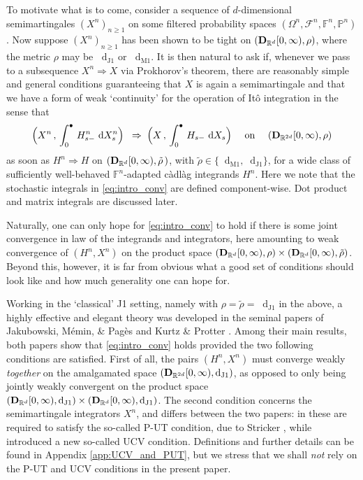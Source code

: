 \documentclass[11pt]{article}
\theoremstyle{definition}\newtheorem{example}[theorem]{Example}
\theoremstyle{definition}\newtheorem{counterexample}[theorem]{Counterexample}
\theoremstyle{definition}\newtheorem{remark}[theorem]{Remark}
\theoremstyle{definition}\newtheorem{defi}[theorem]{Definition}
\numberwithin{equation}{section}
\newcommand{\R}{\mathbb{R}}
\newcommand{\D}{{\bf D}}											%
\newcommand{\F}{\mathbb{F}}											%
\newcommand*\diff{\mathop{}\!\mathrm{d}}								%
\newcommand{\Pro}{\mathbb{P}}										%
\renewcommand{\|}{\; : \, \;}											%
\newcommand{\dJ}{\diff_{\operatorname{J1}}}								%
\newcommand{\dM}{\diff_{\operatorname{M1}}}							%
\begin{document}
To motivate what is to come, consider a sequence of $d$-dimensional semimartingales $(X^n)_{n\geq 1}$ on some filtered probability spaces $(\Omega^n, \mathcal{F}^n, \F^n, \Pro^n)$. Now suppose $(X^n)_{n\geq 1}$ has been shown to be tight on $(\D_{\R^d}[0,\infty),\rho )$, where the metric $\rho$ may be $\dJ$ or $\dM$. It is then natural to ask if, whenever we pass to a subsequence $X^n \Rightarrow X$ via Prokhorov's theorem, there are reasonably simple and general conditions guaranteeing that $X$ is again a semimartingale and that we have a form of weak `continuity' for the operation of Itô integration in the sense that
\begin{equation}\label{eq:intro_conv}
	\Bigl(X^n \,, \,\int_0^\bullet \, H^n_{s-} \, \diff X^n_s \Bigr) \;  \; \Rightarrow \; \Bigl(X\,,\,\int_0^\bullet \, H_{s-} \, \diff X_s \Bigr) \quad \text{ on } \quad  (\D_{\R^{2d}}[0,\infty),\rho )
\end{equation}
as soon as $H^n \Rightarrow H$ on $(\D_{\R^d}[0,\infty) ,  \tilde{\rho}\, )$, with $\tilde{\rho}\in \{\dM, \dJ\}$, for a wide class of sufficiently well-behaved $\F^n$-adapted c\`adl\`ag integrands $H^n$. Here we note that the stochastic integrals in \eqref{eq:intro_conv} are defined component-wise. Dot product and matrix integrals are discussed later.

Naturally, one can only hope for \eqref{eq:intro_conv} to hold if there is some joint convergence in law of the integrands and integrators, here amounting to weak convergence of $(H^n,X^n)$ on the product space $(\D_{\R^d}[0,\infty),\rho )\times (\D_{\R^d}[0,\infty) ,  \tilde{\rho})$. Beyond this, however, it is far from obvious what a good set of conditions should look like and how much generality one can hope for.

Working in the `classical' J1 setting, namely with $\rho=\tilde{\rho}=\dJ $ in the above, a highly effective and elegant theory was developed in the seminal papers of Jakubowski, M\'emin, \& Pag\`es \cite{jakubowskimeminpages} and Kurtz \& Protter \cite{kurtzprotter}. Among their main results, both papers show that \eqref{eq:intro_conv} holds provided the two following conditions are satisfied. First of all, the pairs $(H^n,X^n)$ must converge weakly \emph{together} on the amalgamated space $(\D_{\R^{2d}}[0,\infty),\dJ )$, as opposed to only being jointly weakly convergent on the product space $(\D_{\R^{d}}[0,\infty),\dJ )\times(\D_{\R^{d}}[0,\infty),\dJ ) $. The second condition concerns the semimartingale integrators $X^n$, and differs between the two papers: in \cite{jakubowskimeminpages} these are required to satisfy the so-called P-UT condition, due to Stricker \cite{stricker}, while \cite{kurtzprotter} introduced a new so-called UCV condition. Definitions and further details can be found in Appendix \ref{app:UCV_and_PUT}, but we stress that we shall \emph{not} rely on the P-UT and UCV conditions in the present paper.
\end{document}
